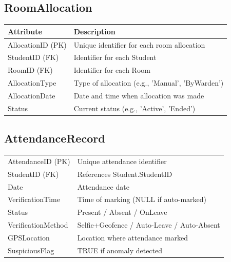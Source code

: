 \documentclass[12pt,a4paper]{article}
\begin{document}
\subsection{RoomAllocation}
\begin{longtable}{|p{4cm}|p{8cm}|}
\hline
\textbf{Attribute} & \textbf{Description} \\
\hline
AllocationID (PK) & Unique identifier for each room allocation \\
StudentID (FK) & Identifier for each Student \\
RoomID (FK) & Identifier for each Room \\
AllocationType & Type of allocation (e.g., 'Manual', 'ByWarden') \\
AllocationDate & Date and time when allocation was made \\
Status & Current status (e.g., 'Active', 'Ended') \\
\hline
\end{longtable}

\subsection{AttendanceRecord}
\begin{longtable}{|p{4cm}|p{8cm}|}
\hline
AttendanceID (PK) & Unique attendance identifier \\
StudentID (FK) & References Student.StudentID \\
Date & Attendance date \\
VerificationTime & Time of marking (NULL if auto-marked) \\
Status & Present / Absent / OnLeave \\
VerificationMethod & Selfie+Geofence / Auto-Leave / Auto-Absent \\
GPSLocation & Location where attendance marked \\
SuspiciousFlag & TRUE if anomaly detected \\
\hline
\end{longtable}
\end{document}
